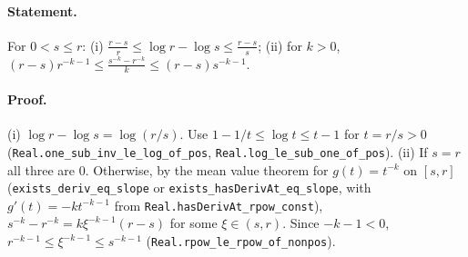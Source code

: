 \paragraph{Statement.} For $0<s\le r$: (i) $\frac{r-s}r\le\log r-\log s\le\frac{r-s}s$; (ii) for
$k>0$, $(r-s)r^{-k-1}\le\frac{s^{-k}-r^{-k}}k\le(r-s)s^{-k-1}$.
\paragraph{Proof.} (i) $\log r-\log s=\log(r/s)$. Use $1-1/t\le\log t\le t-1$ for $t=r/s>0$
(\texttt{Real.one\_sub\_inv\_le\_log\_of\_pos}, \texttt{Real.log\_le\_sub\_one\_of\_pos}).
(ii) If $s=r$ all three are $0$. Otherwise, by the mean value theorem for $g(t)=t^{-k}$ on
$[s,r]$ (\texttt{exists\_deriv\_eq\_slope} or \texttt{exists\_hasDerivAt\_eq\_slope}, with
$g'(t)=-kt^{-k-1}$ from \texttt{Real.hasDerivAt\_rpow\_const}), $s^{-k}-r^{-k}=k\xi^{-k-1}(r-s)$ for
some $\xi\in(s,r)$. Since $-k-1<0$, $r^{-k-1}\le\xi^{-k-1}\le s^{-k-1}$
(\texttt{Real.rpow\_le\_rpow\_of\_nonpos}).
